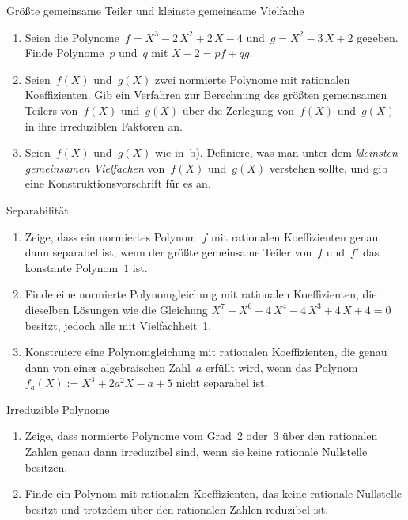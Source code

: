 \documentclass{algblatt}
\begin{document}
\vspace*{-1.5cm}

\begin{aufgabe}{Größte gemeinsame Teiler und kleinste gemeinsame Vielfache}
\begin{enumerate}
\item Seien die Polynome~$f = X^3 - 2\,X^2 + 2\,X - 4$
und~$g = X^2 - 3\,X + 2$ gegeben. Finde Polynome~$p$ und~$q$ mit
$X-2 = p f + q g$.
\item Seien~$f(X)$ und~$g(X)$ zwei normierte Polynome mit rationalen
Koeffizienten. Gib ein Verfahren zur Berechnung des größten gemeinsamen Teilers
von~$f(X)$ und~$g(X)$ über die Zerlegung von~$f(X)$ und~$g(X)$ in ihre
irreduziblen Faktoren an.
\item Seien~$f(X)$ und~$g(X)$ wie in~b). Definiere, was man unter dem
\emph{kleinsten gemeinsamen Vielfachen} von~$f(X)$ und~$g(X)$ verstehen sollte,
und gib eine Konstruktionsvorschrift für es an.
\end{enumerate}
\end{aufgabe}

\begin{aufgabe}{Separabilität}
\begin{enumerate}
\item Zeige, dass ein normiertes Polynom~$f$ mit rationalen Koeffizienten genau
dann separabel ist, 
wenn der größte gemeinsame Teiler von~$f$
und~$f'$ das konstante Polynom~$1$ ist.
\item Finde eine normierte Polynomgleichung mit rationalen
Koeffizienten, die dieselben Lösungen wie die
Gleichung $X^7+X^6-4\,X^4-4\,X^3+4\,X+4=0$ besitzt, jedoch alle mit
Vielfachheit~1.
\item Konstruiere eine Polynomgleichung mit rationalen Koeffizienten, die genau dann
von einer algebraischen Zahl~$a$ erfüllt wird, wenn das Polynom~$f_a(X) := X^3
+ 2a^2 X - a + 5$ nicht separabel ist.
\end{enumerate}
\end{aufgabe}

\begin{aufgabe}{Irreduzible Polynome}
\begin{enumerate}
\item Zeige, dass normierte Polynome vom Grad~2 oder~3 über den rationalen
Zahlen genau dann irreduzibel sind, wenn sie keine rationale Nullstelle
besitzen.
\item Finde ein Polynom mit rationalen Koeffizienten, das keine rationale
Nullstelle besitzt und trotzdem über den rationalen Zahlen reduzibel ist.
\end{enumerate}
\end{aufgabe}
\end{document}
